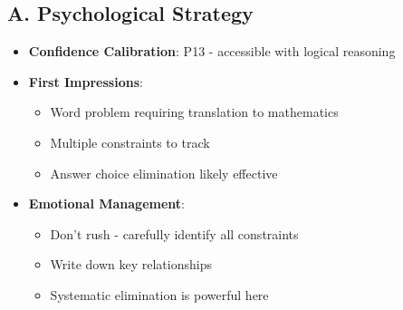 \documentclass[12pt]{article}
\begin{document}
\begin{strategicbox}
\subsection*{A. Psychological Strategy}
\begin{itemize}[leftmargin=*]
    \item \textbf{Confidence Calibration}: P13 - accessible with logical reasoning
    \item \textbf{First Impressions}: 
    \begin{itemize}
        \item Word problem requiring translation to mathematics
        \item Multiple constraints to track
        \item Answer choice elimination likely effective
    \end{itemize}
    \item \textbf{Emotional Management}: 
    \begin{itemize}
        \item Don't rush - carefully identify all constraints
        \item Write down key relationships
        \item Systematic elimination is powerful here
    \end{itemize}
\end{itemize}


\end{strategicbox}
\end{document}
